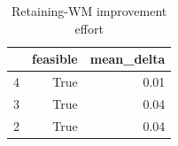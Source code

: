 \begin{table}[htbp]
\centering
\caption{Retaining-WM improvement effort}
\label{tab:e1-wm}
\begin{tabular}{lrr}
\toprule
 & feasible & mean\_delta \\
\midrule
4 & True & 0.01 \\
3 & True & 0.04 \\
2 & True & 0.04 \\
\bottomrule
\end{tabular}
\end{table}
